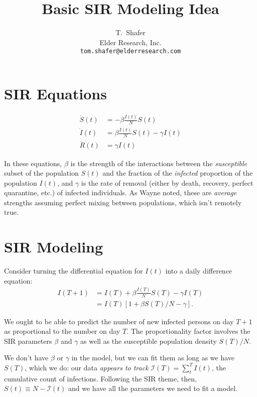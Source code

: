 \documentclass[11pt]{article}
\title{Basic SIR Modeling Idea}
\author{
  T.~Shafer\\
  Elder Research, Inc.\\
  \texttt{tom.shafer@elderresearch.com}
}
\begin{document}
\maketitle

\section{SIR Equations}

\begin{equation}
\begin{aligned}
    \dot S(t) &= -\beta \frac{I(t)}{N} S(t) \\
    \dot I(t) &=  \beta \frac{I(t)}{N} S(t) - \gamma I(t) \\
    \dot R(t) &=  \gamma I(t)
\end{aligned}
\end{equation}

In these equations, $\beta$ is the strength of the interactions between the \textit{susceptible} subset of the population $S(t)$ and the fraction of the \textit{infected} proportion of the population $I(t)$, and $\gamma$ is the rate of removal (either by death, recovery, perfect quarantine, etc.) of infected individuals. As Wayne noted, these are \textit{average} strengths assuming perfect mixing between populations, which isn't remotely true.

\section{SIR Modeling}

Consider turning the differential equation for $I(t)$ into a daily difference equation:
$$
\begin{aligned}
I(T+1) &= I(T) + \beta \frac{I(T)}{N} S(T) - \gamma I(T) \\
 &= I(T) \left[ 1 + \beta S(T) / N - \gamma \right].
\end{aligned}
$$

We ought to be able to predict the number of new infected persons on day $T+1$ as proportional to the number on day $T$. The proportionality factor involves the SIR parameters $\beta$ and $\gamma$ as well as the susceptible population density $S(T)/N$.

We don't have $\beta$ or $\gamma$ in the model, but we can fit them as long as we have $S(T)$, which we do: our data \textit{appears to track} $\mathcal{I}(T) = \sum_t^T I(t) $, the cumulative count of infections. Following the SIR theme, then, $S(t) \equiv N - \mathcal{I}(t)$ and we have all the parameters we need to fit a model.
\end{document}
